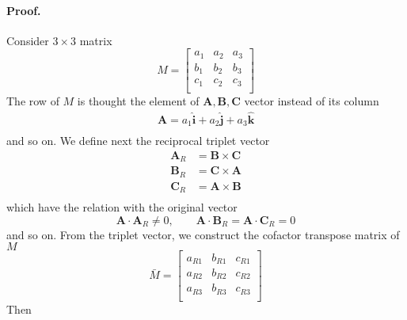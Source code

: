 \documentclass[../main.tex]{subfiles}
\begin{document}
\paragraph*{Proof.}
Consider $3 \times  3$ matrix
\begin{equation*}
	M=
	\begin{bmatrix}
		a_1&a_2&a_3\\
		b_1&b_2&b_3\\
		c_1&c_2&c_3\\
	\end{bmatrix}
\end{equation*}
The row of $M$ is thought the element of $\mathbf{A},\mathbf{B },\mathbf{C}$ vector instead of its column
\begin{align*}
	\mathbf{A}=a_1 \mathbf{\hat{i}}+a_2 \mathbf{\hat{j }}+a_3 \mathbf{\hat{k}}\\
\end{align*}
and so on. 
We define next the reciprocal triplet vector
\begin{align*}
	\mathbf{A}_R&=\mathbf{B }\times \mathbf{C }\\
	\mathbf{B}_R&=\mathbf{C }\times \mathbf{A }\\
	\mathbf{C}_R&=\mathbf{A }\times \mathbf{B }\\
\end{align*}
which have the relation with the original vector
\begin{equation*}
	\mathbf{A }\cdot  \mathbf{A}_R\neq0,\qquad \mathbf{A }\cdot  \mathbf{B }_R=\mathbf{A }\cdot  \mathbf{C}_R=0
\end{equation*}
and so on.
From the triplet vector, we construct the cofactor transpose matrix of $M$
\begin{equation*}
	\bar{M }=
	\begin{bmatrix}
		a_{R1}&b_{R1}&c_{R1}\\
		a_{R2}&b_{R2}&c_{R2}\\
		a_{R3}&b_{R3}&c_{R3}\\
	\end{bmatrix}
\end{equation*} 
Then 
\end{document}
